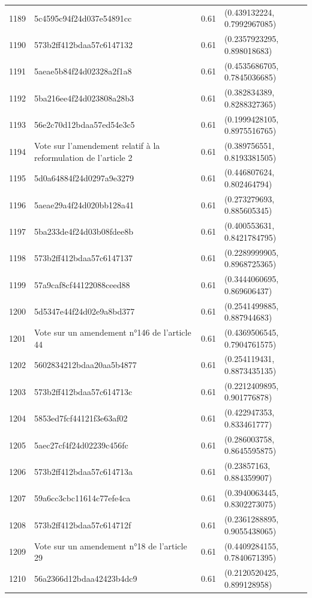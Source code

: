 \begin{table}[ht]
\begin{tabular}{rlrl}
  1189 & 5c4595c94f24d037e54891cc & 0.61 & (0.439132224, 0.7992967085) \\ 
  1190 & 573b2ff412bdaa57c6147132 & 0.61 & (0.2357923295, 0.898018683) \\ 
  1191 & 5aeae5b84f24d02328a2f1a8 & 0.61 & (0.4535686705, 0.7845036685) \\ 
  1192 & 5ba216ee4f24d023808a28b3 & 0.61 & (0.382834389, 0.8288327365) \\ 
  1193 & 56e2c70d12bdaa57ed54e3c5 & 0.61 & (0.1999428105, 0.8975516765) \\ 
  1194 & Vote sur l'amendement relatif à la reformulation de l'article 2 & 0.61 & (0.389756551, 0.8193381505) \\ 
  1195 & 5d0a64884f24d0297a9e3279 & 0.61 & (0.446807624, 0.802464794) \\ 
  1196 & 5aeae29a4f24d020bb128a41 & 0.61 & (0.273279693, 0.885605345) \\ 
  1197 & 5ba233de4f24d03b08fdee8b & 0.61 & (0.400553631, 0.8421784795) \\ 
  1198 & 573b2ff412bdaa57c6147137 & 0.61 & (0.2289999905, 0.8968725365) \\ 
  1199 & 57a9caf8cf44122088ceed88 & 0.61 & (0.3444060695, 0.869606437) \\ 
  1200 & 5d5347e44f24d02e9a8bd377 & 0.61 & (0.2541499885, 0.887944683) \\ 
  1201 & Vote sur un amendement n°146 de l'article 44 & 0.61 & (0.4369506545, 0.7904761575) \\ 
  1202 & 5602834212bdaa20aa5b4877 & 0.61 & (0.254119431, 0.8873435135) \\ 
  1203 & 573b2ff412bdaa57c614713c & 0.61 & (0.2212409895, 0.901776878) \\ 
  1204 & 5853ed7fcf44121f3e63af02 & 0.61 & (0.422947353, 0.833461777) \\ 
  1205 & 5aec27cf4f24d02239c456fc & 0.61 & (0.286003758, 0.8645595875) \\ 
  1206 & 573b2ff412bdaa57c614713a & 0.61 & (0.23857163, 0.884359907) \\ 
  1207 & 59a6cc3cbc11614c77efe4ca & 0.61 & (0.3940063445, 0.8302273075) \\ 
  1208 & 573b2ff412bdaa57c614712f & 0.61 & (0.2361288895, 0.9055438065) \\ 
  1209 & Vote sur un amendement n°18 de l'article 29 & 0.61 & (0.4409284155, 0.7840671395) \\ 
  1210 & 56a2366d12bdaa42423b4dc9 & 0.61 & (0.2120520425, 0.899128958) \\ 

\end{tabular}
\end{table}
